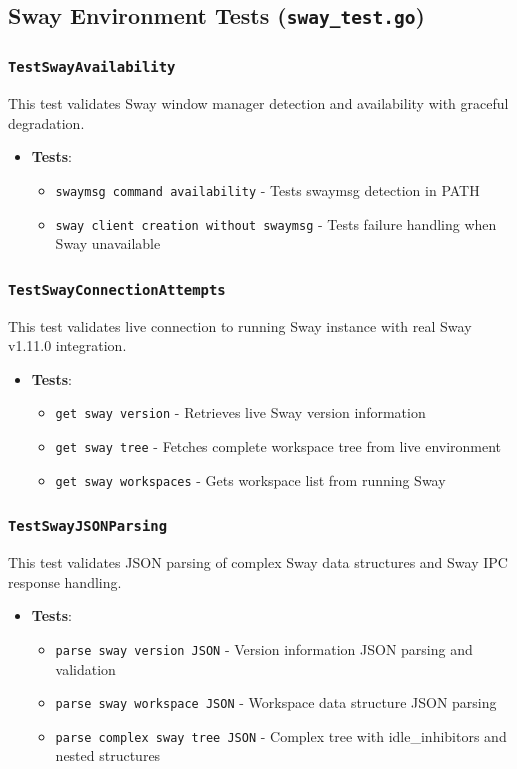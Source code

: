 \subsection{Sway Environment Tests (\texttt{sway\_test.go})}

\subsubsection*{\texttt{TestSwayAvailability}}
This test validates Sway window manager detection and availability with graceful degradation.
\begin{itemize}
    \item \textbf{Tests}:
    \begin{itemize}
        \item \texttt{swaymsg command availability} - Tests swaymsg detection in PATH
        \item \texttt{sway client creation without swaymsg} - Tests failure handling when Sway unavailable
    \end{itemize}
\end{itemize}

\subsubsection*{\texttt{TestSwayConnectionAttempts}}
This test validates live connection to running Sway instance with real Sway v1.11.0 integration.
\begin{itemize}
    \item \textbf{Tests}:
    \begin{itemize}
        \item \texttt{get sway version} - Retrieves live Sway version information
        \item \texttt{get sway tree} - Fetches complete workspace tree from live environment
        \item \texttt{get sway workspaces} - Gets workspace list from running Sway
    \end{itemize}
\end{itemize}

\subsubsection*{\texttt{TestSwayJSONParsing}}
This test validates JSON parsing of complex Sway data structures and Sway IPC response handling.
\begin{itemize}
    \item \textbf{Tests}:
    \begin{itemize}
        \item \texttt{parse sway version JSON} - Version information JSON parsing and validation
        \item \texttt{parse sway workspace JSON} - Workspace data structure JSON parsing
        \item \texttt{parse complex sway tree JSON} - Complex tree with idle\_inhibitors and nested structures
    \end{itemize}
\end{itemize}

